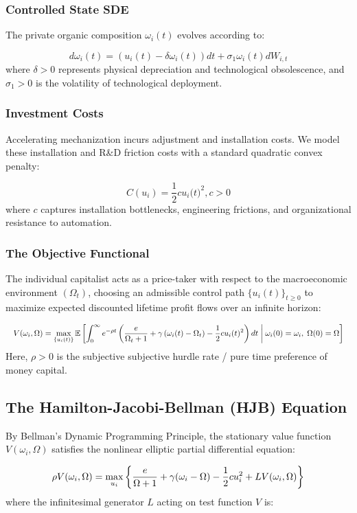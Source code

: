 \documentclass[11pt,letterpaper]{report}
\newcommand{\fitmath}[1]{\begingroup\setbox0=\hbox{$\displaystyle #1$}\ifdim\wd0>\linewidth\resizebox{\linewidth}{!}{$\displaystyle #1$}\else\displaystyle #1\fi\endgroup}
\begin{document}
\subsubsection{Controlled State SDE}
The private organic composition ${\omega }_{i}(t)$ evolves according to:

\[
d{\omega }_{i}(t)=\left({{u}_{i}(t)-\delta {\omega }_{i}(t)}\right)dt+{\sigma }_{1}{\omega }_{i}(t)d{W}_{i,t}
\]
where $\delta >0$ represents physical depreciation and technological obsolescence, and ${\sigma }_{1}>0$ is the volatility of technological deployment.

\subsubsection{Investment Costs}
Accelerating mechanization incurs adjustment and installation costs. We model these installation and R\&D friction costs with a standard quadratic convex penalty:

\[
C({u}_{i})=\frac{1}{2}c{u}_{i}(t{)}^{2},c>0
\]
where $c$ captures installation bottlenecks, engineering frictions, and organizational resistance to automation.

\subsubsection{The Objective Functional}
The individual capitalist acts as a price-taker with respect to the macroeconomic environment $({\Omega }_{t})$, choosing an admissible control path $\{{u}_{i}(t){\}}_{t\geq 0}$ to maximize expected discounted lifetime profit flows over an infinite horizon:

\[\fitmath{V(\omega_i, \Omega) = \max_{\{u_i(t)\}} \mathbb{E} \left[ \int_0^\infty e^{-\rho t} \left( \frac{e}{\Omega_t + 1} + \gamma \left( \omega_i(t) - \Omega_t \right) - \frac{1}{2} c u_i(t)^2 \right) dt \;\middle\vert\; \omega_i(0) = \omega_i, \; \Omega(0) = \Omega \right]}\]
Here, $\rho >0$ is the subjective subjective hurdle rate / pure time preference of money capital.

\subsection{The Hamilton-Jacobi-Bellman (HJB) Equation}
By Bellman's Dynamic Programming Principle, the stationary value function $V({\omega }_{i},\Omega )$ satisfies the nonlinear elliptic partial differential equation:

\[\fitmath{\rho V({\omega }_{i},\Omega )=\max_{{u}_{i}}\left\{{\frac{e}{\Omega +1}+\gamma ({\omega }_{i}-\Omega )-\frac{1}{2}c{u}_{i}^{2}+LV({\omega }_{i},\Omega )}\right\}}\]
where the infinitesimal generator $L$ acting on test function $V$ is:
\end{document}
